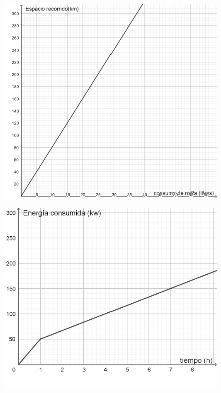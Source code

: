 \documentclass[oneside,spanish]{amsart}
\numberwithin{equation}{section}
\numberwithin{figure}{section}
\begin{document}
\begin{description}[itemsep=10pt]
    \begin{figure}[ht]
      \centering
      \begin{minipage}[b]{0.3\linewidth}
        \centering
        \includegraphics[width=\linewidth]{imagenes/proporcionalidad directa.png}
        \label{fig:proporcionalidad-directa}
      \end{minipage}
      \hfill
      \begin{minipage}[b]{0.3\linewidth}
        \centering
        \includegraphics[width=\linewidth]{imagenes/No proporcionalidad directa2.png}

\end{minipage}
\end{figure}
\end{description}
\end{document}
